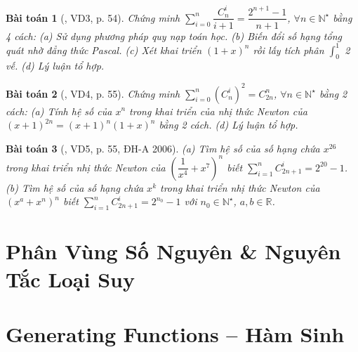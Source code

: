 \documentclass[oneside]{book}
\newtheorem{baitoan}{Bài toán}
\begin{document}
\begin{baitoan}[\cite{Phuong_to_hop}, VD3, p. 54]
	Chứng minh $\sum_{i=0}^n \dfrac{C_n^i}{i+1} = \dfrac{2^{n+1} - 1}{n + 1}$, $\forall n\in\mathbb{N}^\star$ bằng 4 cách: (a) Sử dụng phương pháp quy nạp toán học. (b) Biến đổi số hạng tổng quát nhờ đẳng thức Pascal. (c) Xét khai triển $(1 + x)^n$ rồi lấy tích phân $\int_0^1$ 2 vế. (d) Lý luận tổ hợp.
\end{baitoan}

\begin{baitoan}[\cite{Phuong_to_hop}, VD4, p. 55]
	Chứng minh $\sum_{i=0}^n (C_n^i)^2 = C_{2n}^n$, $\forall n\in\mathbb{N}^\star$ bằng 2 cách: (a) Tính hệ số của $x^n$ trong khai triển của nhị thức Newton của $(x + 1)^{2n} = (x + 1)^n(1 + x)^n$ bằng 2 cách. (d) Lý luận tổ hợp.
\end{baitoan}

\begin{baitoan}[\cite{Phuong_to_hop}, VD5, p. 55, ĐH-A 2006]
	(a) Tìm hệ số của số hạng chứa $x^{26}$ trong khai triển nhị thức Newton của $\left(\dfrac{1}{x^4} + x^7\right)^n$ biết $\sum_{i=1}^n C_{2n+1}^i = 2^{20} - 1$. (b) Tìm hệ số của số hạng chứa $x^k$ trong khai triển nhị thức Newton của $\left(x^a + x^n\right)^n$ biết $\sum_{i=1}^n C_{2n+1}^i = 2^{n_0} - 1$ với $n_0\in\mathbb{N}^\star$, $a,b\in\mathbb{R}$.
\end{baitoan}


\chapter{Phân Vùng Số Nguyên \& Nguyên Tắc Loại Suy}
\minitoc


\chapter{Generating Functions -- Hàm Sinh}
\minitoc

\end{document}
